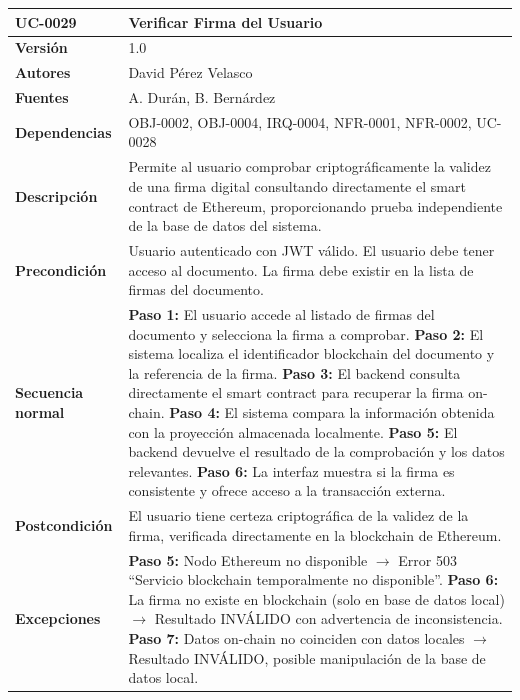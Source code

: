 \documentclass[11pt, a4paper]{article}
\begin{document}
\begin{longtable}{|p{4cm}|p{10cm}|}
\hline
\textbf{UC-0029} & Verificar Firma del Usuario \\
\hline
\textbf{Versión} & 1.0 \\
\hline
\textbf{Autores} & David Pérez Velasco \\
\hline
\textbf{Fuentes} & A. Durán, B. Bernárdez \\
\hline
\textbf{Dependencias} & OBJ-0002, OBJ-0004, IRQ-0004, NFR-0001, NFR-0002, UC-0028 \\
\hline
\textbf{Descripción} & Permite al usuario comprobar criptográficamente la validez de una firma digital consultando directamente el smart contract de Ethereum, proporcionando prueba independiente de la base de datos del sistema. \\
\hline
\textbf{Precondición} & Usuario autenticado con JWT válido. El usuario debe tener acceso al documento. La firma debe existir en la lista de firmas del documento. \\
\hline
\textbf{Secuencia normal} &
\textbf{Paso 1:} El usuario accede al listado de firmas del documento y selecciona la firma a comprobar.\newline
\textbf{Paso 2:} El sistema localiza el identificador blockchain del documento y la referencia de la firma.\newline
\textbf{Paso 3:} El backend consulta directamente el smart contract para recuperar la firma on-chain.\newline
\textbf{Paso 4:} El sistema compara la información obtenida con la proyección almacenada localmente.\newline
\textbf{Paso 5:} El backend devuelve el resultado de la comprobación y los datos relevantes.\newline
\textbf{Paso 6:} La interfaz muestra si la firma es consistente y ofrece acceso a la transacción externa.\\
\hline
\textbf{Postcondición} & El usuario tiene certeza criptográfica de la validez de la firma, verificada directamente en la blockchain de Ethereum. \\
\hline
\textbf{Excepciones} &
\textbf{Paso 5:} Nodo Ethereum no disponible $\rightarrow$ Error 503 ``Servicio blockchain temporalmente no disponible''.\newline
\textbf{Paso 6:} La firma no existe en blockchain (solo en base de datos local) $\rightarrow$ Resultado INVÁLIDO con advertencia de inconsistencia.\newline
\textbf{Paso 7:} Datos on-chain no coinciden con datos locales $\rightarrow$ Resultado INVÁLIDO, posible manipulación de la base de datos local.\\

\end{longtable}
\end{document}
